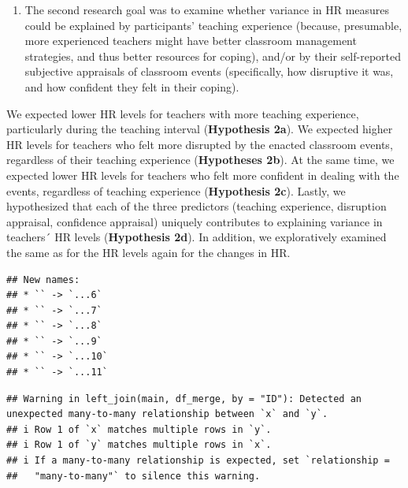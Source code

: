 \documentclass[]{elsarticle} %
\providecommand{\tightlist}{%
  \setlength{\itemsep}{0pt}\setlength{\parskip}{0pt}}
\begin{document}
\begin{enumerate}
\def\labelenumi{(\arabic{enumi})}
\setcounter{enumi}{1}
\tightlist
\item
  The second research goal was to examine whether variance in HR
  measures could be explained by participants' teaching experience
  (because, presumable, more experienced teachers might have better
  classroom management strategies, and thus better resources for
  coping), and/or by their self-reported subjective appraisals of
  classroom events (specifically, how disruptive it was, and how
  confident they felt in their coping).
\end{enumerate}

We expected lower HR levels for teachers with more teaching experience,
particularly during the teaching interval (\textbf{Hypothesis 2a}). We
expected higher HR levels for teachers who felt more disrupted by the
enacted classroom events, regardless of their teaching experience
(\textbf{Hypotheses 2b}). At the same time, we expected lower HR levels
for teachers who felt more confident in dealing with the events,
regardless of teaching experience (\textbf{Hypothesis 2c}). Lastly, we
hypothesized that each of the three predictors (teaching experience,
disruption appraisal, confidence appraisal) uniquely contributes to
explaining variance in teachers´ HR levels (\textbf{Hypothesis 2d}). In
addition, we exploratively examined the same as for the HR levels again
for the changes in HR.

\begin{verbatim}
## New names:
## * `` -> `...6`
## * `` -> `...7`
## * `` -> `...8`
## * `` -> `...9`
## * `` -> `...10`
## * `` -> `...11`
\end{verbatim}

\begin{verbatim}
## Warning in left_join(main, df_merge, by = "ID"): Detected an unexpected many-to-many relationship between `x` and `y`.
## i Row 1 of `x` matches multiple rows in `y`.
## i Row 1 of `y` matches multiple rows in `x`.
## i If a many-to-many relationship is expected, set `relationship =
##   "many-to-many"` to silence this warning.
\end{verbatim}
\end{document}
